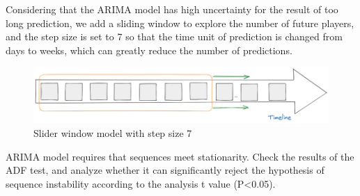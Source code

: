 \documentclass[12pt]{article}  %
\begin{document}
Considering that the ARIMA model has high uncertainty for the result of too long prediction, we add a sliding window to explore the number of future players, and the step size is set to 7 so that the time unit of prediction is changed from days to weeks, which can greatly reduce the number of predictions.
\begin{figure}[htbp]
\centering
\includegraphics[width=.7\textwidth]{img/timeStep.png}
\caption{Slider window model with step size 7}\label{fig:result}
\end{figure}

ARIMA model requires that sequences meet stationarity. Check the results of the ADF test, and analyze whether it can significantly reject the hypothesis of sequence instability according to the analysis t value (P<0.05).
\end{document}
